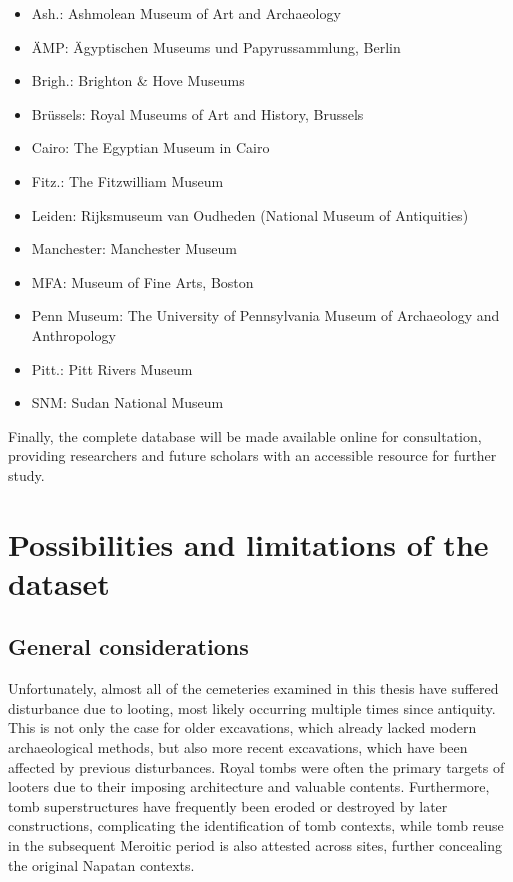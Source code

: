 \begin{itemize}
	\item Ash.: Ashmolean Museum of Art and Archaeology
	\item ÄMP: Ägyptischen Museums und Papyrussammlung, Berlin
	\item Brigh.: Brighton \& Hove Museums
	\item Brüssels: Royal Museums of Art and History, Brussels
	\item Cairo: The Egyptian Museum in Cairo
	\item Fitz.: The Fitzwilliam Museum
	\item Leiden: Rijksmuseum van Oudheden (National Museum of Antiquities)
	\item Manchester: Manchester Museum
	\item MFA: Museum of Fine Arts, Boston
	\item Penn Museum: The University of Pennsylvania Museum of Archaeology and Anthropology
	\item Pitt.: Pitt Rivers Museum
	\item SNM: Sudan National Museum
\end{itemize}


Finally, the complete database will be made available online for consultation, providing researchers and future scholars with an accessible resource for further study.


\section{Possibilities and limitations of the dataset}


\subsection{General considerations}


Unfortunately, almost all of the cemeteries examined in this thesis have suffered disturbance due to looting, most likely occurring multiple times since antiquity. This is not only the case for older excavations, which already lacked modern archaeological methods, but also more recent excavations, which have been affected by previous disturbances. Royal tombs were often the primary targets of looters due to their imposing architecture and valuable contents. Furthermore, tomb superstructures have frequently been eroded or destroyed by later constructions, complicating the identification of tomb contexts, while tomb reuse in the subsequent Meroitic period is also attested across sites, further concealing the original Napatan contexts. 


